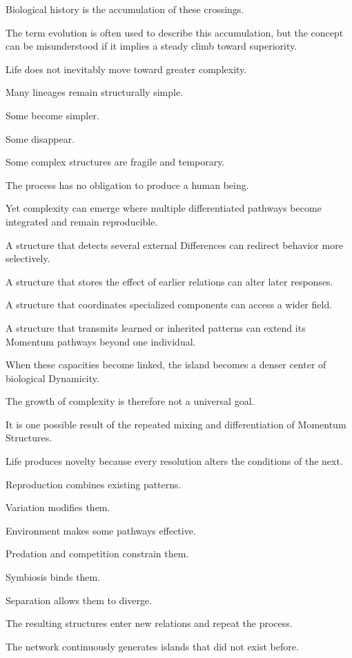 Biological history is the accumulation of these crossings.

The term evolution is often used to describe this accumulation, but the concept can be misunderstood if it implies a steady climb toward superiority.

Life does not inevitably move toward greater complexity.

Many lineages remain structurally simple.

Some become simpler.

Some disappear.

Some complex structures are fragile and temporary.

The process has no obligation to produce a human being.

Yet complexity can emerge where multiple differentiated pathways become integrated and remain reproducible.

A structure that detects several external Differences can redirect behavior more selectively.

A structure that stores the effect of earlier relations can alter later responses.

A structure that coordinates specialized components can access a wider field.

A structure that transmits learned or inherited patterns can extend its Momentum pathways beyond one individual.

When these capacities become linked, the island becomes a denser center of biological Dynamicity.

The growth of complexity is therefore not a universal goal.

It is one possible result of the repeated mixing and differentiation of Momentum Structures.

Life produces novelty because every resolution alters the conditions of the next.

Reproduction combines existing patterns.

Variation modifies them.

Environment makes some pathways effective.

Predation and competition constrain them.

Symbiosis binds them.

Separation allows them to diverge.

The resulting structures enter new relations and repeat the process.

The network continuously generates islands that did not exist before.

